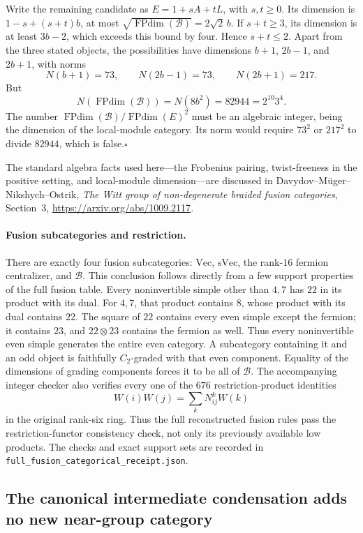 Write the remaining candidate as $E=1+sA+tL$, with $s,t\geq0$.
Its dimension is $1-s+(s+t)b$, at most
$\sqrt{\operatorname{FPdim}(\mathcal B)}=2\sqrt2\,b$.
If $s+t\geq3$, its dimension is at least $3b-2$, which exceeds this
bound by four. Hence $s+t\leq2$. Apart from the three stated objects,
the possibilities have dimensions $b+1$, $2b-1$, and $2b+1$, with norms
\[
 N(b+1)=73,\qquad N(2b-1)=73,\qquad N(2b+1)=217.
\]
But
\[
 N(\operatorname{FPdim}(\mathcal B))=N(8b^2)
   =82944=2^{10}3^4.
\]
The number $\operatorname{FPdim}(\mathcal B)/\operatorname{FPdim}(E)^2$
must be an algebraic integer, being the dimension of the local-module
category. Its norm would require $73^2$ or $217^2$ to divide $82944$,
which is false.\hfill$\square$

The standard algebra facts used here---the Frobenius pairing,
twist-freeness in the positive setting, and local-module dimension---are
discussed in Davydov--M\"uger--Nikshych--Ostrik,
\emph{The Witt group of non-degenerate braided fusion categories},
Section~3, \url{https://arxiv.org/abs/1009.2117}.

\paragraph{Fusion subcategories and restriction.}
There are exactly four fusion subcategories: $\mathrm{Vec}$,
$\mathrm{sVec}$, the rank-$16$ fermion centralizer, and $\mathcal B$.
This conclusion follows directly from a few support properties of the
full fusion table. Every noninvertible simple other than $4,7$ has $22$
in its product with its dual. For $4,7$, that product contains $8$, whose
product with its dual contains $22$. The square of $22$ contains every
even simple except the fermion; it contains $23$, and $22\otimes23$
contains the fermion as well. Thus every noninvertible even simple
generates the entire even category. A subcategory containing it and an
odd object is faithfully $C_2$-graded with that even component. Equality
of the dimensions of grading components forces it to be all of
$\mathcal B$.
The accompanying integer checker also verifies every one of the $676$
restriction-product identities
\[
 W(i)W(j)=\sum_k N_{ij}^{k}W(k)
\]
in the original rank-six ring. Thus the full reconstructed fusion rules
pass the restriction-functor consistency check, not only its previously
available low products. The checks and exact support sets are recorded
in \texttt{full\_fusion\_categorical\_receipt.json}.

\subsection{The canonical intermediate condensation adds no new
near-group category}

